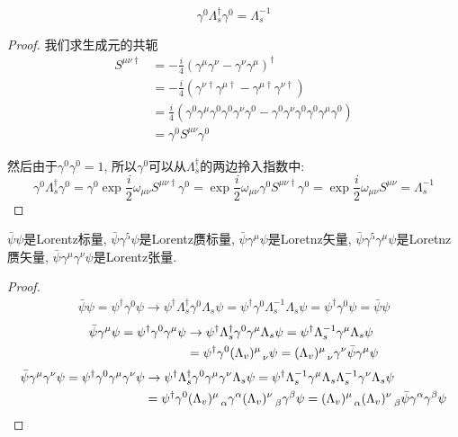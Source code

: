 \begin{theorem}
    \begin{equation}
        \gamma^0\Lambda_s^\dagger\gamma^0=\Lambda_s^{-1}
    \end{equation}
\end{theorem}
\begin{proof}
    我们求生成元的共轭
    \begin{align}
        S^{\mu\nu\dagger}&=-\frac i4(\gamma^\mu\gamma^\nu-\gamma^\nu\gamma^\mu)^\dagger\\
        &=-\frac i4(\gamma^{\nu\dagger}\gamma^{\mu\dagger}-\gamma^{\mu\dagger}\gamma^{\nu\dagger})\\
        &=\frac i4(\gamma^0\gamma^\mu\gamma^0\gamma^0\gamma^\nu\gamma^0-\gamma^0\gamma^\nu\gamma^0\gamma^0\gamma^\mu\gamma^0)\\
        &=\gamma^0S^{\mu\nu}\gamma^0
    \end{align}

    然后由于$\gamma^0\gamma^0=1$, 所以$\gamma^0$可以从$\Lambda_s^\dagger$的两边拎入指数中:
    \begin{equation}
        \gamma^0\Lambda_s^\dagger\gamma^0=\gamma^0\exp{\frac i2\omega_{\mu\nu}S^{\mu\nu\dagger}}\gamma^0=\exp{\frac i2\omega_{\mu\nu}\gamma^0S^{\mu\nu\dagger}\gamma^0}=\exp{\frac i2\omega_{\mu\nu}S^{\mu\nu}}=\Lambda_s^{-1}
    \end{equation}
\end{proof}

\begin{theorem}
    $\bar\psi\psi$是Lorentz标量, $\bar\psi\gamma^5\psi$是Lorentz赝标量, $\bar\psi\gamma^\mu\psi$是Loretnz矢量, $\bar\psi\gamma^5\gamma^\mu\psi$是Loretnz赝矢量, $\bar\psi\gamma^\mu\gamma^\nu\psi$是Lorentz张量.
\end{theorem}
\begin{proof}
    \begin{align}
        \bar\psi\psi=\psi^\dagger\gamma^0\psi\to \psi^\dagger\Lambda_s^\dagger\gamma^0\Lambda_s\psi=\psi^\dagger\gamma^0\Lambda_s^{-1}\Lambda_s\psi=\psi^\dagger\gamma^0\psi=\bar\psi\psi
    \end{align}
    \begin{align}
        \bar\psi\gamma^\mu\psi=\psi^\dagger\gamma^0\gamma^\mu\psi&\to\psi^\dagger\Lambda_s^\dagger\gamma^0\gamma^\mu\Lambda_s\psi=\psi^\dagger\Lambda_s^{-1}\gamma^\mu\Lambda_s\psi\notag\\
        &=\psi^\dagger\gamma^0(\Lambda_v)^\mu_{~~\nu}\psi=(\Lambda_v)^\mu_{~~\nu}\gamma^\nu\bar\psi\gamma^\mu\psi
    \end{align}
    \begin{align}
        \bar\psi\gamma^\mu\gamma^\nu\psi=\psi^\dagger\gamma^0\gamma^\mu\gamma^\nu\psi&\to\psi^\dagger\Lambda_s^\dagger\gamma^0\gamma^\mu\gamma^\nu\Lambda_s\psi=\psi^\dagger\Lambda_s^{-1}\gamma^\mu\Lambda_s\Lambda_s^{-1}\gamma^\nu\Lambda_s\psi\notag\\
        &=\psi^\dagger\gamma^0(\Lambda_v)^\mu_{~~\alpha}\gamma^\alpha(\Lambda_v)^\nu_{~~\beta}\gamma^\beta\psi=(\Lambda_v)^\mu_{~~\alpha}(\Lambda_v)^\nu_{~~\beta}\bar\psi\gamma^\alpha\gamma^\beta\psi
    \end{align}
\end{proof}

